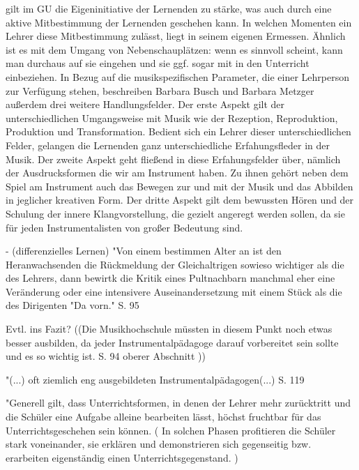 gilt im GU die Eigeninitiative der Lernenden zu stärke, was auch durch eine aktive
Mitbestimmung der Lernenden geschehen kann. In welchen Momenten ein Lehrer diese
Mitbestimmung zulässt, liegt in seinem eigenen Ermessen. Ähnlich ist es mit dem
Umgang von Nebenschauplätzen: wenn es sinnvoll scheint, kann man durchaus auf
sie eingehen und sie ggf. sogar mit in den Unterricht einbeziehen. In Bezug auf
die musikspezifischen Parameter, die einer Lehrperson zur Verfügung stehen,
beschreiben Barbara Busch und Barbara Metzger außerdem drei weitere
Handlungsfelder. Der erste Aspekt gilt der unterschiedlichen Umgangsweise mit
Musik wie der Rezeption, Reproduktion, Produktion und Transformation. Bedient
sich ein Lehrer dieser unterschiedlichen Felder, gelangen die Lernenden ganz
unterschiedliche Erfahungsfleder in der Musik. Der zweite Aspekt geht fließend
in diese Erfahungsfelder über, nämlich der Ausdrucksformen die wir am Instrument
haben. Zu ihnen gehört neben dem Spiel am Instrument auch das Bewegen zur und
mit der Musik und das Abbilden in jeglicher kreativen Form. Der dritte Aspekt
gilt dem bewussten Hören und der Schulung der innere Klangvorstellung, die
gezielt angeregt werden sollen, da sie für
jeden Instrumentalisten von großer Bedeutung sind.

- (differenzielles Lernen)
"Von einem bestimmen Alter an ist den Heranwachsenden die Rückmeldung der
Gleichaltrigen sowieso wichtiger als die des Lehrers, dann bewirtk die Kritik
eines Pultnachbarn manchmal eher eine Veränderung oder eine intensivere
Auseinandersetzung mit einem Stück als die des Dirigenten "Da vorn." S. 95


Evtl. ins Fazit? ((Die Musikhochschule müssten in diesem Punkt noch etwas besser ausbilden, da
jeder Instrumentalpädagoge darauf vorbereitet sein sollte und es so wichtig ist.
S. 94 oberer Abschnitt ))

"(...) oft ziemlich eng ausgebildeten Instrumentalpädagogen(...) S. 119


"Generell gilt, dass Unterrichtsformen, in denen der Lehrer mehr zurücktritt und
die Schüler eine Aufgabe alleine bearbeiten lässt, höchst fruchtbar für das
Unterrichtsgeschehen sein können. ( In solchen Phasen profitieren die Schüler
stark voneinander, sie erklären und demonstrieren sich gegenseitig bzw.
erarbeiten eigenständig einen Unterrichtsgegenstand. ) 
